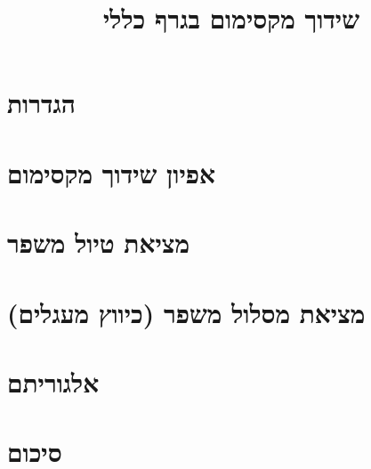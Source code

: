 \documentclass[]{article}
\title{שידוך מקסימום בגרף כללי}
\author{}
\date{}
\begin{document}
\maketitle

\section{הגדרות}


\section{אפיון שידוך מקסימום}


\section{מציאת טיול משפר}


\newpage
\section{
מציאת מסלול משפר (כיווץ מעגלים) 
}


\newpage
\section{אלגוריתם}


\section{סיכום}

\end{document}
